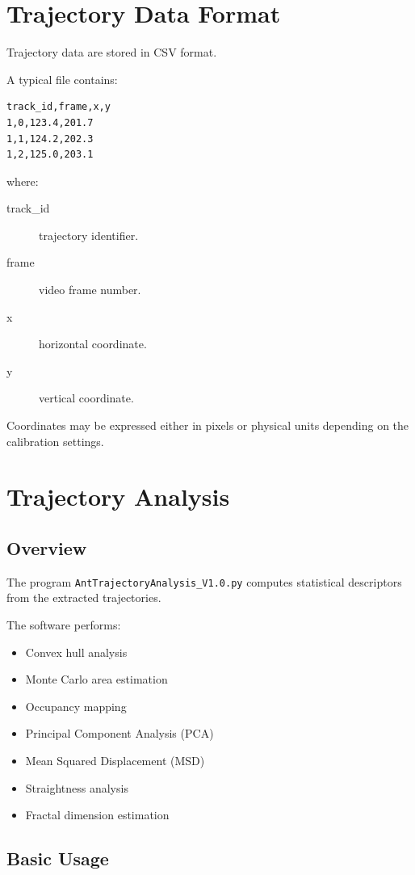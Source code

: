 \documentclass[11pt,a4paper]{article}
\begin{document}
\section{Trajectory Data Format}

Trajectory data are stored in CSV format.

A typical file contains:

\begin{verbatim}
track_id,frame,x,y
1,0,123.4,201.7
1,1,124.2,202.3
1,2,125.0,203.1
\end{verbatim}

where:

\begin{description}
\item[track\_id] trajectory identifier.
\item[frame] video frame number.
\item[x] horizontal coordinate.
\item[y] vertical coordinate.
\end{description}

Coordinates may be expressed either in pixels or physical units depending on the calibration settings.

\section{Trajectory Analysis}

\subsection{Overview}

The program \texttt{AntTrajectoryAnalysis\_V1.0.py} computes statistical descriptors from the extracted trajectories.

The software performs:

\begin{itemize}
\item Convex hull analysis
\item Monte Carlo area estimation
\item Occupancy mapping
\item Principal Component Analysis (PCA)
\item Mean Squared Displacement (MSD)
\item Straightness analysis
\item Fractal dimension estimation
\end{itemize}

\subsection{Basic Usage}
\end{document}
